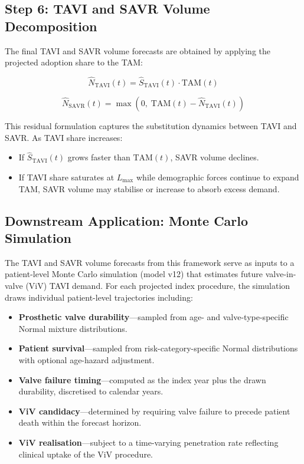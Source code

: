 \documentclass[12pt, a4paper]{article}
\begin{document}
\subsection{Step 6: TAVI and SAVR Volume Decomposition}

The final TAVI and SAVR volume forecasts are obtained by applying the projected adoption share to the TAM:

\begin{equation}
    \hat{N}_{\mathrm{TAVI}}(t) = \hat{S}_{\mathrm{TAVI}}(t) \cdot \mathrm{TAM}(t)
\end{equation}

\begin{equation}
    \hat{N}_{\mathrm{SAVR}}(t) = \max\!\left(0, \; \mathrm{TAM}(t) - \hat{N}_{\mathrm{TAVI}}(t)\right)
\end{equation}

This residual formulation captures the substitution dynamics between TAVI and SAVR. As TAVI share increases:

\begin{itemize}[leftmargin=*, itemsep=4pt]
    \item If $\hat{S}_{\mathrm{TAVI}}(t)$ grows faster than $\mathrm{TAM}(t)$, SAVR volume declines.
    \item If TAVI share saturates at $L_{\max}$ while demographic forces continue to expand TAM, SAVR volume may stabilise or increase to absorb excess demand.
\end{itemize}

\subsection{Downstream Application: Monte Carlo Simulation}

The TAVI and SAVR volume forecasts from this framework serve as inputs to a patient-level Monte Carlo simulation (model v12) that estimates future valve-in-valve (ViV) TAVI demand. For each projected index procedure, the simulation draws individual patient-level trajectories including:

\begin{itemize}[leftmargin=*, itemsep=2pt]
    \item \textbf{Prosthetic valve durability}---sampled from age- and valve-type-specific Normal mixture distributions.
    \item \textbf{Patient survival}---sampled from risk-category-specific Normal distributions with optional age-hazard adjustment.
    \item \textbf{Valve failure timing}---computed as the index year plus the drawn durability, discretised to calendar years.
    \item \textbf{ViV candidacy}---determined by requiring valve failure to precede patient death within the forecast horizon.
    \item \textbf{ViV realisation}---subject to a time-varying penetration rate reflecting clinical uptake of the ViV procedure.
\end{itemize}
\end{document}
